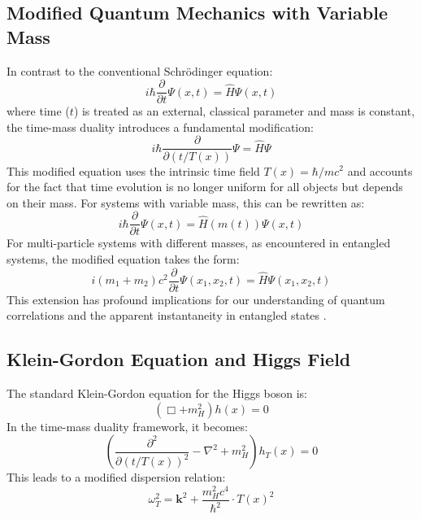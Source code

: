 \documentclass[12pt,a4paper]{article}
\newcommand{\Tfield}{T(x)}
\begin{document}
	\subsection{Modified Quantum Mechanics with Variable Mass}
	In contrast to the conventional Schrödinger equation:
	\begin{equation}
		i\hbar \frac{\partial}{\partial t}\Psi(x,t) = \hat{H}\Psi(x,t)
	\end{equation}
	where time (\(t\)) is treated as an external, classical parameter and mass is constant, the time-mass duality introduces a fundamental modification:
	\begin{equation}
		i\hbar \frac{\partial}{\partial (t/\Tfield)}\Psi = \hat{H}\Psi
	\end{equation}
	This modified equation uses the intrinsic time field \(\Tfield = \hbar/mc^2\) and accounts for the fact that time evolution is no longer uniform for all objects but depends on their mass. For systems with variable mass, this can be rewritten as:
	\begin{equation}
		i\hbar \frac{\partial}{\partial t}\Psi(x,t) = \hat{H}(m(t))\Psi(x,t)
	\end{equation}
	For multi-particle systems with different masses, as encountered in entangled systems, the modified equation takes the form:
	\begin{equation}
		i (m_1 + m_2) c^2 \frac{\partial}{\partial t} \Psi(x_1, x_2, t) = \hat{H} \Psi(x_1, x_2, t)
	\end{equation}
	This extension has profound implications for our understanding of quantum correlations and the apparent instantaneity in entangled states \cite{Pascher2024}\relax.
	
	\subsection{Klein-Gordon Equation and Higgs Field}
	The standard Klein-Gordon equation for the Higgs boson is:
	\begin{equation}
		(\Box + m_H^2) h(x) = 0
	\end{equation}
	In the time-mass duality framework, it becomes:
	\begin{equation}
		\left(\frac{\partial^2}{\partial(t/\Tfield)^2} - \nabla^2 + m_H^2\right) h_T(x) = 0
	\end{equation}
	This leads to a modified dispersion relation:
	\begin{equation}
		\omega_T^2 = \mathbf{k}^2 + \frac{m_H^2 c^4}{\hbar^2} \cdot T(x)^2
	\end{equation}
	
\end{document}
